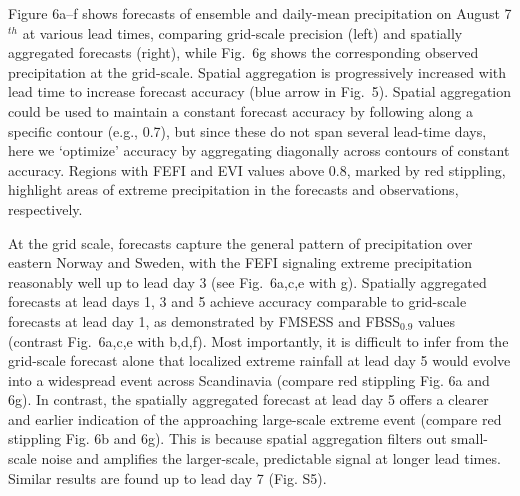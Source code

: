 \documentclass[preprint,12pt,authoryear]{elsarticle}
\begin{document}
Figure 6a--f shows forecasts of ensemble and daily-mean precipitation on August 7$^{th}$ at various lead times, comparing grid-scale precision (left) and spatially aggregated forecasts (right), while Fig.~6g shows the corresponding observed precipitation at the grid-scale. Spatial aggregation is progressively increased with lead time to increase forecast accuracy (blue arrow in Fig.~5). Spatial aggregation could be used to maintain a constant forecast accuracy by following along a specific contour (e.g., 0.7), but since these do not span several lead-time days, here we `optimize' accuracy by aggregating diagonally across contours of constant accuracy. Regions with FEFI and EVI values above 0.8, marked by red stippling, highlight areas of extreme precipitation in the forecasts and observations, respectively. 



At the grid scale, forecasts capture the general pattern of precipitation over eastern Norway and Sweden, with the FEFI signaling extreme precipitation reasonably well up to lead day 3 (see Fig.~6a,c,e with g). Spatially aggregated forecasts at lead days 1, 3 and 5 achieve accuracy comparable to grid-scale forecasts at lead day 1, as demonstrated by FMSESS and FBSS$_{0.9}$ values (contrast Fig.~6a,c,e with b,d,f). Most importantly, it is difficult to infer from the grid-scale forecast alone that localized extreme rainfall at lead day 5 would evolve into a widespread event across Scandinavia (compare red stippling Fig. 6a and 6g). In contrast, the spatially aggregated forecast at lead day 5 offers a clearer and earlier indication of the approaching large-scale extreme event (compare red stippling Fig. 6b and 6g). This is because spatial aggregation filters out small-scale noise and amplifies the larger-scale, predictable signal at longer lead times. Similar results are found up to lead day 7 (Fig. S5).
\end{document}
